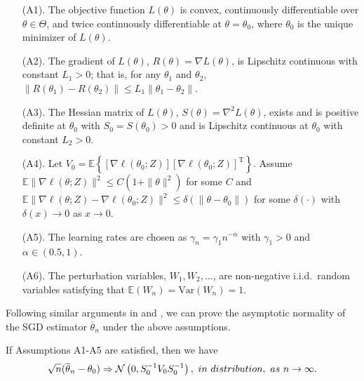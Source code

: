 \documentclass[twoside,11pt]{article}
\def\trans{^{ \mathrm{\scriptscriptstyle T} }}
\def\ol{\overline}
\begin{document}
\begin{enumerate}
	\item[(A1).] The objective function $L(\theta)$ is convex, continuously differentiable over $\theta\in \Theta$, and twice continuously differentiable at $\theta=\theta_0$, where $\theta_0$ is the unique minimizer of $L(\theta)$.

	\item[(A2).] The gradient of $L(\theta)$, $R(\theta)=\nabla L(\theta)$, is Lipschitz continuous with constant $L_1>0$; that is, for any  $\theta_1$ and $\theta_2$, $\|R(\theta_1)-R(\theta_2)\|\leq L_1\|\theta_1-\theta_2\|$.

	\item[(A3).] The Hessian matrix of $L(\theta)$, $S(\theta)=\nabla^2 L(\theta)$, exists and is positive definite at $\theta_0$ with $S_0=S(\theta_0)>0$ and is Lipschitz continuous at $\theta_0$ with constant $L_2>0$.

	\item[(A4).] Let $V_0=\mathbb{E}\left\{[\nabla \ell(\theta_0; Z)][\nabla \ell(\theta_0; Z)]\trans\right\}$.  Assume $\mathbb{E}\|\nabla \ell(\theta; Z)\|^2\leq C(1+\|\theta\|^2)$ for some $C$ and $\mathbb{E}\|\nabla \ell(\theta; Z)-\nabla \ell(\theta_0; Z)\|^2\leq \delta(\|\theta-\theta_0\|)$ for some $\delta(\cdot)$ with $\delta(x)\rightarrow 0$ as $x\rightarrow 0$.

	\item[(A5).] The learning rates are chosen as $\gamma_n=\gamma_1 n^{-\alpha}$ with $\gamma_1>0$ and $\alpha\in(0.5, 1)$.

	\item[(A6).] The perturbation variables, $W_1, W_2, \dots$, are non-negative i.i.d.~random variables satisfying that $\mathbb{E}(W_n)=\mbox{Var}(W_n)=1$.
\end{enumerate}

Following similar arguments in  \cite{Ruppert88} and \cite{Polyak92}, we can prove the asymptotic normality of the SGD estimator $\ol{\theta}_n$ under the above assumptions.

\begin{lemma}
	\label{normality-set1}
	If Assumptions A1-A5 are satisfied, then we have
	\begin{eqnarray}
	\sqrt{n}(\ol{\theta}_n-\theta_0) \Rightarrow \mathcal{N}\left(0, S_0^{-1}V_0S_0^{-1}\right), {\mbox \ in \ distribution,\ as\ } n \rightarrow \infty.
	\end{eqnarray}
\end{lemma}
\end{document}
